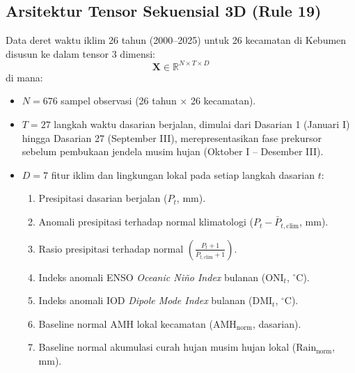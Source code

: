 \documentclass[11pt,a4paper]{article}
\begin{document}
\subsection{Arsitektur Tensor Sekuensial 3D (Rule 19)}
Data deret waktu iklim 26 tahun (2000--2025) untuk 26 kecamatan di Kebumen disusun ke dalam tensor 3 dimensi:
\begin{equation}
    \mathbf{X} \in \mathbb{R}^{N \times T \times D}
\end{equation}
di mana:
\begin{itemize}
    \item $N = 676$ sampel observasi (26 tahun $\times$ 26 kecamatan).
    \item $T = 27$ langkah waktu dasarian berjalan, dimulai dari Dasarian 1 (Januari I) hingga Dasarian 27 (September III), merepresentasikan fase prekursor sebelum pembukaan jendela musim hujan (Oktober I -- Desember III).
    \item $D = 7$ fitur iklim dan lingkungan lokal pada setiap langkah dasarian $t$:
    \begin{enumerate}
        \item Presipitasi dasarian berjalan ($P_t$, mm).
        \item Anomali presipitasi terhadap normal klimatologi ($P_t - \bar{P}_{t,\text{clim}}$, mm).
        \item Rasio presipitasi terhadap normal $\left(\frac{P_t + 1}{\bar{P}_{t,\text{clim}} + 1}\right)$.
        \item Indeks anomali ENSO \textit{Oceanic Ni\~no Index} bulanan ($\text{ONI}_t$, $^\circ\text{C}$).
        \item Indeks anomali IOD \textit{Dipole Mode Index} bulanan ($\text{DMI}_t$, $^\circ\text{C}$).
        \item Baseline normal AMH lokal kecamatan ($\text{AMH}_{\text{norm}}$, dasarian).
        \item Baseline normal akumulasi curah hujan musim hujan lokal ($\text{Rain}_{\text{norm}}$, mm).
    \end{enumerate}
\end{itemize}
\end{document}
